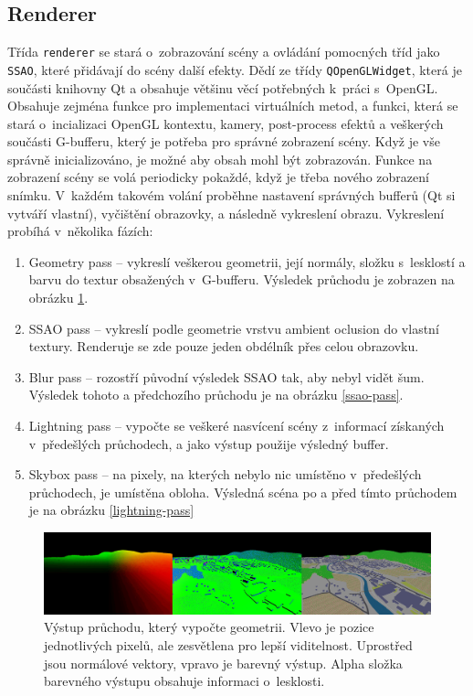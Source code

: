 \subsection*{Renderer}
Třída \verb|renderer| se stará o~zobrazování scény a ovládání pomocných tříd jako \verb|SSAO|, které přidávají do scény další efekty. Dědí ze třídy \verb|QOpenGLWidget|, která je součásti knihovny Qt a obsahuje většinu věcí potřebných k~práci s~OpenGL. Obsahuje zejména funkce pro implementaci virtuálních metod, a funkci, která se stará o~incializaci OpenGL kontextu, kamery, post-process efektů a veškerých součásti G-bufferu, který je potřeba pro správné zobrazení scény. Když je vše správně inicializováno, je možné aby obsah mohl být zobrazován. Funkce na zobrazení scény se volá periodicky pokaždé, když je třeba nového zobrazení snímku. V~každém takovém volání proběhne nastavení správných bufferů (Qt si vytváří vlastní), vyčištění obrazovky, a následně vykreslení obrazu. Vykreslení probíhá v~několika fázích:
\begin{enumerate}
    \item Geometry pass  -- vykreslí veškerou geometrii, její normály, složku s~lesklostí a barvu do textur obsažených v~G-bufferu. Výsledek průchodu je zobrazen na obrázku \ref{geometry-pass}.
    \item SSAO pass -- vykreslí podle geometrie vrstvu ambient oclusion do vlastní textury. Renderuje se zde pouze jeden obdélník přes celou obrazovku.
    \item Blur pass -- rozostří původní výsledek SSAO tak, aby nebyl vidět šum. Výsledek tohoto a předchozího průchodu je na obrázku \ref{ssao-pass}.
    \item Lightning pass -- vypočte se veškeré nasvícení scény z~informací získaných v~předešlých průchodech, a jako výstup použije výsledný buffer.
    \item Skybox pass -- na pixely, na kterých nebylo nic umístěno v~předešlých průchodech, je umístěna obloha. Výsledná scéna po a před tímto průchodem je na obrázku \ref{lightning-pass}
\end{enumerate}

\begin{figure}[H]
	\centering
	\includegraphics[width=38em]{images/impl/gbuffer/geom.jpg}
	\caption[caption]{Výstup průchodu, který vypočte geometrii. Vlevo je pozice jednotlivých pixelů, ale zesvětlena pro lepší viditelnost. Uprostřed jsou normálové vektory, vpravo je barevný výstup. Alpha složka barevného výstupu obsahuje informaci o~lesklosti.} 
	\label{geometry-pass}
\end{figure}


